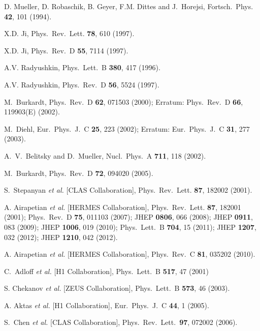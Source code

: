 \documentclass[twocolumn,nofootinbib,showpacs,prl,superscriptaddress,secnumarabic,amssymb,nobibnotes,aps,floatfix]{revtex4}
\begin{document}
\begin{thebibliography}{99}

D. Mueller, D. Robaschik, B. Geyer, F.M. Dittes and J.~Horejsi,
Fortsch.\ Phys. {\bf 42}, 101 (1994).
  
X.D. Ji,
Phys.\ Rev.\ Lett. {\bf 78}, 610 (1997).

X.D. Ji,
Phys.\ Rev.\ D {\bf 55}, 7114 (1997).

A.V. Radyushkin,
Phys.\ Lett.\  B {\bf 380}, 417 (1996).

A.V. Radyushkin,
Phys.\ Rev.\ D {\bf 56}, 5524 (1997).

  M.~Burkardt,
  Phys.\ Rev.\ D {\bf 62}, 071503 (2000);
  Erratum: Phys.\ Rev.\ D {\bf 66}, 119903(E) (2002).

  M.~Diehl,
  Eur.\ Phys.\ J.\ C {\bf 25}, 223 (2002);
  Erratum: Eur.\ Phys.\ J.\ C {\bf 31}, 277 (2003).
 
  A.~V.~Belitsky and D.~Mueller,
  Nucl.\ Phys.\ A {\bf 711}, 118 (2002).

  M.~Burkardt,
  Phys.\ Rev.\ D {\bf 72}, 094020 (2005).

S.~Stepanyan {\it et al.} [CLAS Collaboration],
Phys.\ Rev.\ Lett. {\bf 87}, 182002 (2001).

A. Airapetian {\it et al.} [HERMES Collaboration],
Phys.\ Rev.\ Lett. {\bf 87}, 182001 (2001);
Phys.\ Rev.\  D {\bf 75}, 011103 (2007);
JHEP {\bf 0806}, 066 (2008);
JHEP {\bf 0911}, 083 (2009);
JHEP {\bf 1006}, 019 (2010);
Phys.\ Lett.\ B {\bf 704}, 15 (2011);
JHEP {\bf 1207}, 032 (2012);
JHEP {\bf 1210}, 042 (2012).

A. Airapetian {\it et al.} [HERMES Collaboration],
Phys.\ Rev.\ C {\bf 81}, 035202 (2010).

  C.~Adloff {\it et al.} [H1 Collaboration],
  Phys.\ Lett.\ B {\bf 517}, 47 (2001)

S. Chekanov {\it et al.} [ZEUS Collaboration],
Phys.\ Lett.\  B {\bf 573}, 46 (2003).

A. Aktas {\it et al.} [H1 Collaboration],
Eur.\ Phys.\ J.\ C {\bf 44}, 1 (2005).

S.~Chen {\it et al.} [CLAS Collaboration],
Phys.\ Rev.\ Lett.\ {\bf 97}, 072002 (2006).


\end{thebibliography}
\end{document}
